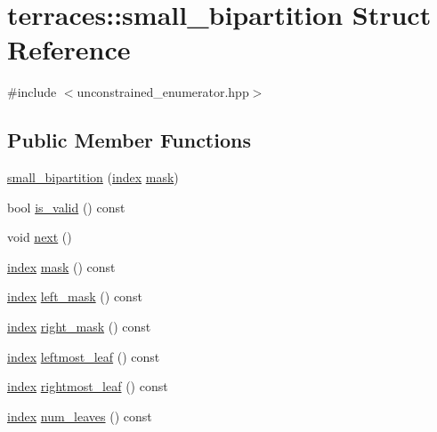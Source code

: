 \hypertarget{structterraces_1_1small__bipartition}{}\section{terraces\+:\+:small\+\_\+bipartition Struct Reference}
\label{structterraces_1_1small__bipartition}


{\ttfamily \#include $<$unconstrained\+\_\+enumerator.\+hpp$>$}

\subsection*{Public Member Functions}
\begin{DoxyCompactItemize}
\item 
\hyperlink{structterraces_1_1small__bipartition_a0f2922ef65a57bd424b0f8a200d5c2b9}{small\+\_\+bipartition} (\hyperlink{namespaceterraces_adbc33ccb543d1634e96d0eb02e472c77}{index} \hyperlink{structterraces_1_1small__bipartition_ad1e1ffe92be1066adb84d98c6987d6bb}{mask})
\item 
bool \hyperlink{structterraces_1_1small__bipartition_a8d0f599781285ae580c3fd90254698d0}{is\+\_\+valid} () const
\item 
void \hyperlink{structterraces_1_1small__bipartition_ae47c5f647c0e2fb26ea08011772bea9a}{next} ()
\item 
\hyperlink{namespaceterraces_adbc33ccb543d1634e96d0eb02e472c77}{index} \hyperlink{structterraces_1_1small__bipartition_ad1e1ffe92be1066adb84d98c6987d6bb}{mask} () const
\item 
\hyperlink{namespaceterraces_adbc33ccb543d1634e96d0eb02e472c77}{index} \hyperlink{structterraces_1_1small__bipartition_a907f8818601439b4048d43dc4ffb8364}{left\+\_\+mask} () const
\item 
\hyperlink{namespaceterraces_adbc33ccb543d1634e96d0eb02e472c77}{index} \hyperlink{structterraces_1_1small__bipartition_a54fe7cb417f0e1728fb1d4a8b6c22ba5}{right\+\_\+mask} () const
\item 
\hyperlink{namespaceterraces_adbc33ccb543d1634e96d0eb02e472c77}{index} \hyperlink{structterraces_1_1small__bipartition_ac898947c97bac91255e22be00a5f3e45}{leftmost\+\_\+leaf} () const
\item 
\hyperlink{namespaceterraces_adbc33ccb543d1634e96d0eb02e472c77}{index} \hyperlink{structterraces_1_1small__bipartition_a16a2a79ef1b8e4ca9602adc3263aa597}{rightmost\+\_\+leaf} () const
\item 
\hyperlink{namespaceterraces_adbc33ccb543d1634e96d0eb02e472c77}{index} \hyperlink{structterraces_1_1small__bipartition_aab1364ba4e2e755934b006bb0588a5b8}{num\+\_\+leaves} () const
\end{DoxyCompactItemize}
